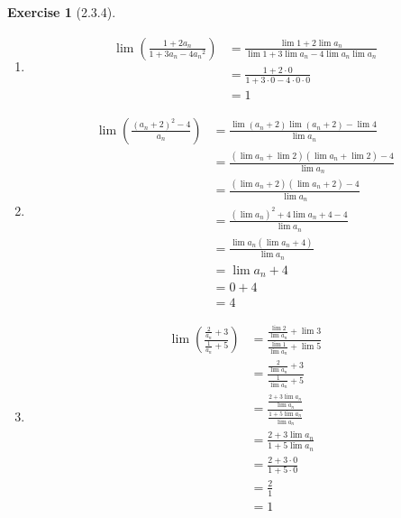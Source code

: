 \documentclass{amsart}
\theoremstyle{definition}
\newtheorem{exercise}{Exercise}
\begin{document}
\begin{exercise}[2.3.4]
  \begin{enumerate}[label={(\alph*)}]
    \item
      \begin{align*}
        \lim\left(\frac{1 + 2a_n}{1 + 3a_n - 4{a_n}^2}\right) &= \frac{\lim{1} +
        2 \lim{a_n}}{\lim{1} + 3 \lim{a_n} - 4 \lim{a_n} \lim{a_n}} \\
        &= \frac{1 + 2 \cdot 0}{ 1 + 3 \cdot 0 - 4 \cdot 0 \cdot 0} \\
        &= 1
      \end{align*}
    \item
      \begin{align*}
        \lim\left(\frac{{(a_n + 2)}^2 - 4}{a_n}\right) &= \frac{\lim(a_n + 2)
        \lim(a_n + 2) - \lim{4}}{\lim{a_n}} \\
        &= \frac{(\lim{a_n} + \lim{2}) (\lim{a_n} + \lim{2}) - 4}{\lim{a_n}} \\
        &= \frac{(\lim{a_n} + 2) (\lim{a_n} + 2) - 4}{\lim{a_n}} \\
        &= \frac{{(\lim{a_n})}^2 + 4 \lim{a_n} + 4 - 4}{\lim{a_n}} \\
        &= \frac{\lim{a_n} (\lim{a_n} + 4)}{\lim{a_n}} \\
        &= \lim{a_n} + 4 \\
        &= 0 + 4 \\
        &= 4
      \end{align*}
    \item
      \begin{align*}
        \lim\left(\frac{\frac{2}{a_n} + 3}{\frac{1}{a_n} + 5}\right) &=
        \frac{\frac{\lim{2}}{\lim{a_n}} + \lim{3}}{\frac{\lim{1}}{\lim{a_n}} +
        \lim{5}} \\
        &= \frac{\frac{2}{\lim{a_n}} + 3}{\frac{1}{\lim{a_n}} + 5} \\
        &= \frac{\frac{2 + 3 \lim{a_n}}{\lim{a_n}}}{\frac{1 + 5
        \lim{a_n}}{\lim{a_n}}} \\
        &= \frac{2 + 3 \lim{a_n}}{1 + 5 \lim{a_n}} \\
        &= \frac{2 + 3 \cdot 0}{1 + 5 \cdot 0} \\
        &= \frac{2}{1} \\
        &= 1
      \end{align*}
  \end{enumerate}
\end{exercise}
\end{document}

